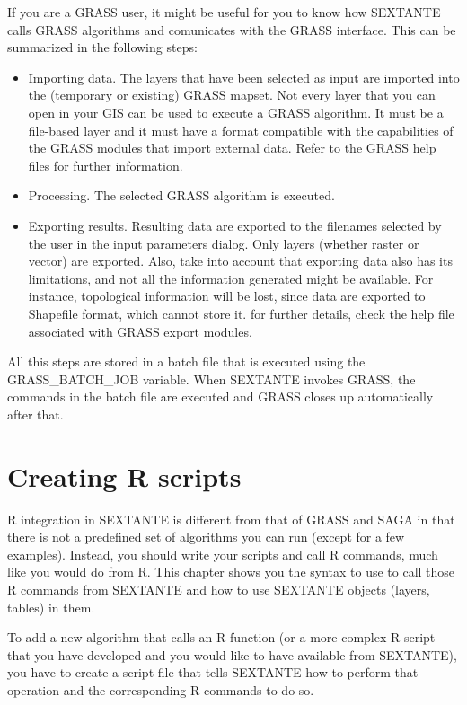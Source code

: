 If you are a GRASS user, it might be useful for you to know how SEXTANTE calls GRASS algorithms and comunicates with the GRASS interface. This can be summarized in the following steps:

\begin{itemize}
 \item Importing data. The layers that have been selected as input are imported into the (temporary or existing) GRASS mapset. Not every layer that you can open in your GIS can be used to execute a GRASS algorithm. It must be a file-based layer and it must have a format compatible with the capabilities of the GRASS modules that import external data. Refer to the GRASS help files for further information.
 \item Processing. The selected GRASS algorithm is executed.
 \item Exporting results. Resulting data are exported to the filenames selected by the user in the input parameters dialog. Only layers (whether raster or vector) are exported. Also, take into account that exporting data also has its limitations, and not all the information generated might be available. For instance, topological information will be lost, since data are exported to Shapefile format, which cannot store it. for further details, check the help file associated with GRASS export modules.
\end{itemize}

All this steps are stored in a batch file that is executed using the GRASS\_BATCH\_JOB variable. When SEXTANTE invokes GRASS, the commands in the batch file are executed and GRASS closes up automatically after that.

\section{Creating R scripts}\label{rscripts}

R integration in SEXTANTE is different from that of GRASS and SAGA in that there is not a predefined set of algorithms you can run (except for a few examples). Instead, you should write your scripts and call R commands, much like you would do from R. This chapter shows you the syntax to use to call those R commands from SEXTANTE and how to use SEXTANTE objects (layers, tables) in them.

To add a new algorithm that calls an R function (or a more complex R script that you have developed and you would like to have available from SEXTANTE), you have to create a script file that tells SEXTANTE how to perform that operation and the corresponding R commands to do so.

